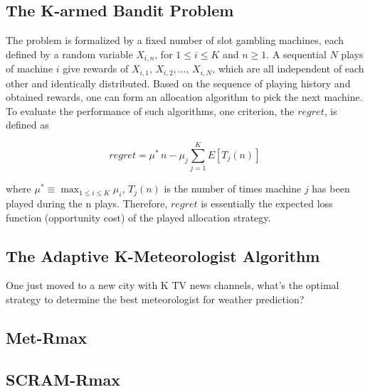 \documentclass[conference]{IEEEtran}
\begin{document}
\subsection{The K-armed Bandit Problem}
The problem is formalized by a fixed number of slot gambling machines, each defined by a random variable $X_{i,n}$, for $1\leq i \leq K$ and $n \geq 1$. A sequential $N$ plays of machine $i$ give rewards of $X_{i,1},\,X_{i,2},\dots,\, X_{i,N}$, which are all independent of each other and identically distributed. Based on the sequence of playing history and obtained rewards, one can form an allocation algorithm to pick the next machine. To evaluate the performance of such algorithms, one criterion, the $regret$, is defined as

\begin{equation*}
	regret = \mu^{*}\,n - \mu_j \sum_{j=1}^K E[T_j(n)]
\end{equation*}

where $\mu^{*} \equiv \max_{1\leq i \leq K} \mu_i$, $T_j(n)$ is the number of times machine $j$ has been played during the n plays. Therefore, $regret$ is essentially the expected loss function (opportunity cost) of the played allocation strategy.

\subsection{The Adaptive K-Meteorologist Algorithm}
One just moved to a new city with K TV news channels, what's the optimal strategy to determine the best meteorologist for weather prediction?

\subsection{Met-Rmax}

\subsection{SCRAM-Rmax}


\end{document}

